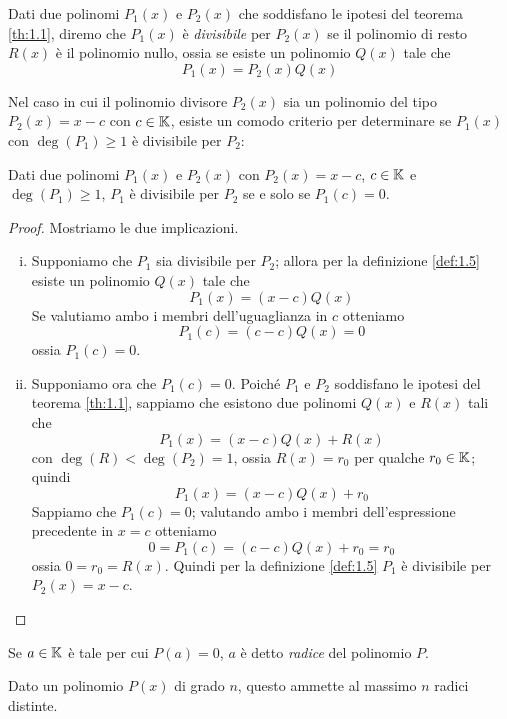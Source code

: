 \begin{definition}
    \label{def:1.5} 
    Dati due polinomi $P_1(x)$ e $P_2(x)$ che soddisfano le ipotesi del teorema \ref{th:1.1}, diremo che $P_1(x)$ è \emph{divisibile} per $P_2(x)$ se il polinomio di resto $R(x)$ è il polinomio nullo, ossia se esiste un polinomio $Q(x)$ tale che
    \[
    P_1(x) = P_2(x)Q(x)
    \]
\end{definition}
Nel caso in cui il polinomio divisore $P_2(x)$ sia un polinomio del tipo $P_2(x) = x-c$ con $c\in\amsbb{K}$, esiste un comodo criterio per determinare se $P_1(x)$ con $\deg(P_1)\ge1$ è divisibile per $P_2$:
\begin{proposition}
    \label{prop:1.1}
    Dati due polinomi $P_1(x)$ e $P_2(x)$ con $P_2(x) = x-c$, $c\in\amsbb{K}$ e $\deg(P_1)\ge 1$, $P_1$ è divisibile per $P_2$ se e solo se $P_1(c)=0$.
\end{proposition}
\begin{proof}
    Mostriamo le due implicazioni.
    \begin{enumerate}[(i)]
        \item Supponiamo che $P_1$ sia divisibile per $P_2$; allora per la definizione \ref{def:1.5} esiste un polinomio $Q(x)$ tale che
        \[
        P_1(x) = (x-c)Q(x)
        \]
        Se valutiamo ambo i membri dell'uguaglianza in $c$ otteniamo
        \[
        P_1(c) = (c-c)Q(x) = 0
        \]
        ossia $P_1(c)=0$.
        \item Supponiamo ora che $P_1(c)=0$. Poiché $P_1$ e $P_2$ soddisfano le ipotesi del teorema \ref{th:1.1}, sappiamo che esistono due polinomi $Q(x)$ e $R(x)$ tali che
        \[
        P_1(x) = (x-c)Q(x)+R(x)
        \]
        con $\deg(R)<\deg(P_2) = 1$, ossia $R(x) = r_0$ per qualche $r_0\in\amsbb{K}$; quindi
        \[
        P_1(x) = (x-c)Q(x)+r_0
        \]
        Sappiamo che $P_1(c)=0$; valutando ambo i membri dell'espressione precedente in $x=c$ otteniamo
        \[
        0=P_1(c) = (c-c)Q(x)+r_0 = r_0
        \]
        ossia $0=r_0 = R(x)$. Quindi per la definizione \ref{def:1.5} $P_1$ è divisibile per $P_2(x) = x-c$.\qedhere
    \end{enumerate}
\end{proof}
\begin{definition}
    \label{def:1.6} Se $a\in\amsbb{K}$ è tale per cui $P(a)=0$, $a$ è detto \emph{radice} del polinomio $P$.
\end{definition}
\begin{proposition}
    \label{prop:1.2}
    Dato un polinomio $P(x)$ di grado $n$, questo ammette al massimo $n$ radici distinte.
\end{proposition}
